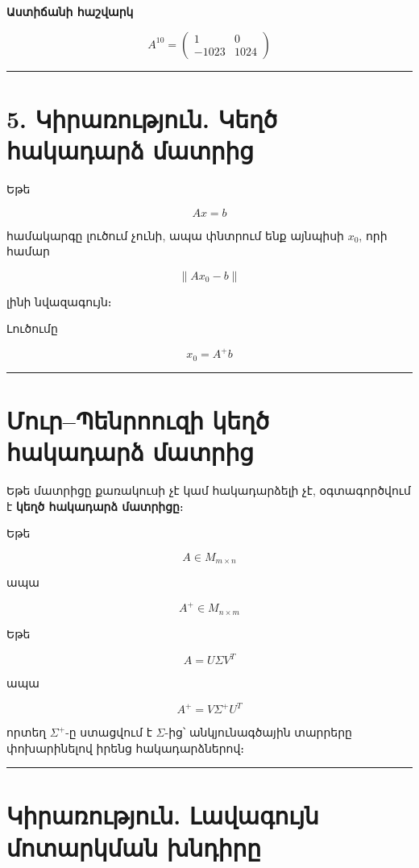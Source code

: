 \documentclass[12pt, a4paper]{article}
\begin{document}
\textbf{Աստիճանի հաշվարկ}

$$
A^{10} =
\begin{pmatrix}
1 & 0 \\
-1023 & 1024
\end{pmatrix}
$$

\vspace{1em}
\hrule
\vspace{1em}

\section{5. Կիրառություն. Կեղծ հակադարձ մատրից}

Եթե

$$
Ax=b
$$

համակարգը լուծում չունի, ապա փնտրում ենք այնպիսի \(x_0\), որի համար

$$
\|Ax_0 - b\|
$$

լինի նվազագույն։

Լուծումը

$$
x_0 = A^+ b
$$

\vspace{1em}
\hrule
\vspace{1em}

\section{Մուր–Պենրոուզի կեղծ հակադարձ մատրից}

Եթե մատրիցը քառակուսի չէ կամ հակադարձելի չէ, օգտագործվում է \textbf{կեղծ հակադարձ մատրիցը}։

Եթե

$$
A \in M_{m\times n}
$$

ապա

$$
A^+ \in M_{n\times m}
$$

Եթե

$$
A = U\Sigma V^T
$$

ապա

$$
A^+ = V \Sigma^+ U^T
$$

որտեղ \(\Sigma^+\)-ը ստացվում է \(\Sigma\)-ից՝ անկյունագծային տարրերը փոխարինելով իրենց հակադարձներով։

\vspace{1em}
\hrule
\vspace{1em}

\section{Կիրառություն. Լավագույն մոտարկման խնդիրը}
\end{document}
